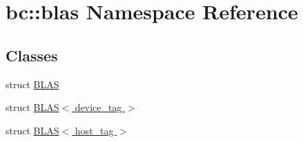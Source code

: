 \hypertarget{namespacebc_1_1blas}{}\section{bc\+:\+:blas Namespace Reference}
\label{namespacebc_1_1blas}
\subsection*{Classes}
\begin{DoxyCompactItemize}
\item 
struct \hyperlink{structbc_1_1blas_1_1BLAS}{B\+L\+AS}
\item 
struct \hyperlink{structbc_1_1blas_1_1BLAS_3_01device__tag_01_4}{B\+L\+A\+S$<$ device\+\_\+tag $>$}
\item 
struct \hyperlink{structbc_1_1blas_1_1BLAS_3_01host__tag_01_4}{B\+L\+A\+S$<$ host\+\_\+tag $>$}
\end{DoxyCompactItemize}
